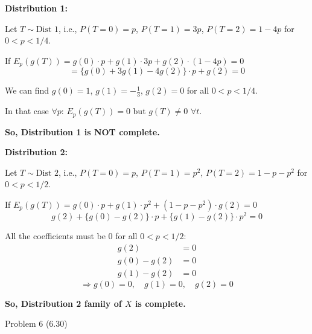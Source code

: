 \documentclass[12pt,a4paper,onecolumn]{exam}
\newcommand{\questionheader}[1]{%
  \begin{tcolorbox}[
    enhanced,
    colback=black,
    coltext=white,
    boxrule=0pt,
    fontupper=\Large\bfseries,
    arc=4mm
  ]
  #1
  \end{tcolorbox}%
}
\begin{document}
\begin{solution}
\textbf{Distribution 1:}

Let $T \sim \text{Dist 1}$, i.e., $P(T=0) = p$, $P(T=1) = 3p$, $P(T=2) = 1-4p$ for $0 < p < 1/4$.

If $E_p(g(T)) = g(0) \cdot p + g(1) \cdot 3p + g(2) \cdot (1-4p) = 0$
\[
= \{g(0) + 3g(1) - 4g(2)\} \cdot p + g(2) = 0
\]

We can find $g(0) = 1$, $g(1) = -\frac{1}{3}$, $g(2) = 0$ for all $0 < p < 1/4$.

In that case $\forall p$: $E_p(g(T)) = 0$ but $g(T) \neq 0$ $\forall t$.

\textbf{So, Distribution 1 is NOT complete.}

\vspace{1em}
\textbf{Distribution 2:}

Let $T \sim \text{Dist 2}$, i.e., $P(T=0) = p$, $P(T=1) = p^2$, $P(T=2) = 1-p-p^2$ for $0 < p < 1/2$.

If $E_p(g(T)) = g(0) \cdot p + g(1) \cdot p^2 + (1-p-p^2) \cdot g(2) = 0$
\[
g(2) + \{g(0) - g(2)\} \cdot p + \{g(1) - g(2)\} \cdot p^2 = 0
\]

All the coefficients must be 0 for all $0 < p < 1/2$:
\begin{align*}
g(2) &= 0 \\
g(0) - g(2) &= 0 \\
g(1) - g(2) &= 0
\end{align*}
\[
\Rightarrow g(0) = 0, \quad g(1) = 0, \quad g(2) = 0
\]

\textbf{So, Distribution 2 family of $X$ is complete.}
\end{solution}

\questionheader{Problem 6 (6.30)}
\end{document}
